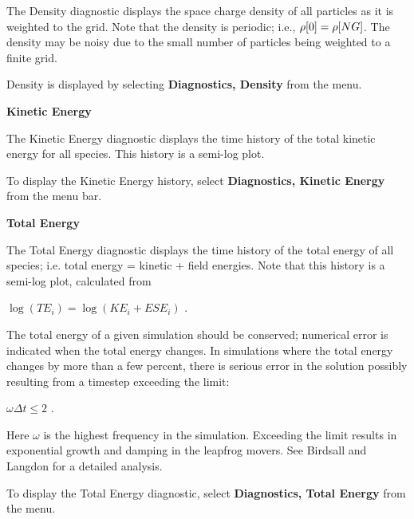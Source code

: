 \begin{section}
\begin{subsection}
\begin{subsubsection}
      The Density diagnostic displays the space charge density of all particles
      as it is weighted to the grid.  Note that the density is periodic; i.e.,
      ${\rm \rho}[0] = {\rm \rho}[NG]$.
      The density may be noisy due to the small
      number of particles being weighted to a finite grid.
\vspace{.2in}

\noindent
      Density is displayed by selecting {\bf Diagnostics, Density} from the menu.
\end{subsubsection}

\begin{subsubsection}
{\bf Kinetic Energy}

      The Kinetic Energy diagnostic displays the time history of the total
      kinetic energy for all species.  This history is a semi-log plot.
\vspace{.2in}

\noindent
      To display the Kinetic Energy history, 
      select {\bf Diagnostics, Kinetic Energy} from the menu bar.
\end{subsubsection}

\begin{subsubsection}
{\bf Total Energy}

      The Total Energy diagnostic displays the time history of the total energy
      of all species; i.e. total energy = kinetic + field energies.  Note that
      this history is a semi-log plot, calculated from
\begin{center}
      $\log(TE_{i}) = \log(KE_{i} + ESE_{i})$ .
\end{center}
\noindent
      The total energy of a given simulation should be conserved; numerical
      error is indicated when the total energy changes.  In simulations where
      the total energy changes by more than a few percent, there is serious
      error in the solution possibly resulting from a timestep exceeding the
      limit:
\begin{center}
      $\omega \Delta t \leq 2$ .
\end{center}
\noindent
      Here $\omega$ is the highest frequency in the simulation.  Exceeding
      the limit results in exponential growth and damping in the leapfrog
      movers.  See Birdsall and Langdon for a detailed analysis.
\vspace{.2in}

\noindent
      To display the Total Energy diagnostic, select 
	{\bf Diagnostics, Total Energy} from the menu.
\end{subsubsection}


\end{subsection}
\end{section}
